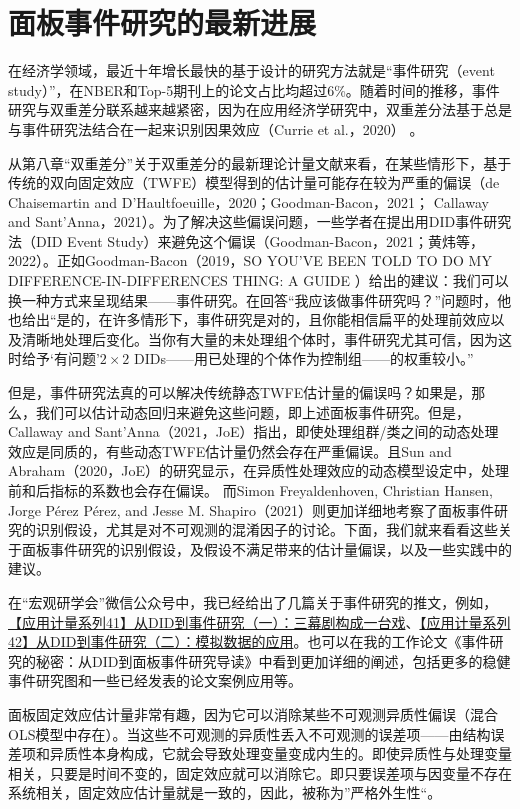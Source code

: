 \documentclass[cn,12pt,math=newtx,citestyle=gb7714-2015,bibstyle=gb7714-2015]{elegantbook}
\begin{document}
	    \section{面板事件研究的最新进展}
	    
	    在经济学领域，最近十年增长最快的基于设计的研究方法就是“事件研究（event study）”，在NBER和Top-5期刊上的论文占比均超过6\%。随着时间的推移，事件研究与双重差分联系越来越紧密，因为在应用经济学研究中，双重差分法基于总是与事件研究法结合在一起来识别因果效应（Currie et al.，2020） 。
	    
	    从第八章“双重差分”关于双重差分的最新理论计量文献来看，在某些情形下，基于传统的双向固定效应（TWFE）模型得到的估计量可能存在较为严重的偏误（de Chaisemartin and D’Haultfoeuille，2020；Goodman-Bacon，2021； Callaway and Sant’Anna，2021）。为了解决这些偏误问题，一些学者在提出用DID事件研究法（DID Event Study）来避免这个偏误（Goodman-Bacon，2021；黄炜等，2022）。正如Goodman-Bacon（2019，SO YOU’VE BEEN TOLD TO DO MY DIFFERENCE-IN-DIFFERENCES THING: A GUIDE ）给出的建议：我们可以换一种方式来呈现结果——事件研究。在回答“我应该做事件研究吗？”问题时，他也给出“是的，在许多情形下，事件研究是对的，且你能相信扁平的处理前效应以及清晰地处理后变化。当你有大量的未处理组个体时，事件研究尤其可信，因为这时给予‘有问题’$2 \times 2$ DIDs——用已处理的个体作为控制组——的权重较小。”

	    
	    但是，事件研究法真的可以解决传统静态TWFE估计量的偏误吗？如果是，那么，我们可以估计动态回归来避免这些问题，即上述面板事件研究。但是，Callaway and Sant’Anna（2021，JoE）指出，即使处理组群/类之间的动态处理效应是同质的，有些动态TWFE估计量仍然会存在严重偏误。且Sun and Abraham（2020，JoE）的研究显示，在异质性处理效应的动态模型设定中，处理前和后指标的系数也会存在偏误。
而Simon Freyaldenhoven, Christian Hansen, Jorge Pérez Pérez, and Jesse M. Shapiro（2021）则更加详细地考察了面板事件研究的识别假设，尤其是对不可观测的混淆因子的讨论。下面，我们就来看看这些关于面板事件研究的识别假设，及假设不满足带来的估计量偏误，以及一些实践中的建议。
	    
	    在“宏观研学会”微信公众号中，我已经给出了几篇关于事件研究的推文，例如，\href{https://mp.weixin.qq.com/s/Vlag2pudOub-IuMEk_snKA}{【应用计量系列41】从DID到事件研究（一）：三幕剧构成一台戏}、\href{https://mp.weixin.qq.com/s/NBgrdJuPSI7Q9Tqq1bAo0g}{【应用计量系列42】从DID到事件研究（二）：模拟数据的应用}。也可以在我的工作论文《事件研究的秘密：从DID到面板事件研究导读》中看到更加详细的阐述，包括更多的稳健事件研究图和一些已经发表的论文案例应用等。
	    
	    面板固定效应估计量非常有趣，因为它可以消除某些不可观测异质性偏误（混合OLS模型中存在）。当这些不可观测的异质性丢入不可观测的误差项——由结构误差项和异质性本身构成，它就会导致处理变量变成内生的。即使异质性与处理变量相关，只要是时间不变的，固定效应就可以消除它。即只要误差项与因变量不存在系统相关，固定效应估计量就是一致的，因此，被称为”严格外生性“。
	    
\end{document}
